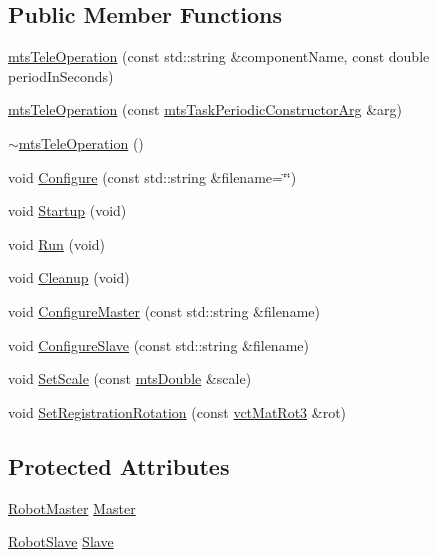 \subsection*{Public Member Functions}
\begin{DoxyCompactItemize}
\item 
\hyperlink{classmts_tele_operation_a6547280de1e8cdcade16708da2cccc2a}{mts\+Tele\+Operation} (const std\+::string \&component\+Name, const double period\+In\+Seconds)
\item 
\hyperlink{classmts_tele_operation_a4082b5b6eb45a3e05f9bce47e3de99d9}{mts\+Tele\+Operation} (const \hyperlink{classmts_task_periodic_constructor_arg}{mts\+Task\+Periodic\+Constructor\+Arg} \&arg)
\item 
\hyperlink{classmts_tele_operation_aa433b36bc093a7a386fb8c39682b6f19}{$\sim$mts\+Tele\+Operation} ()
\item 
void \hyperlink{classmts_tele_operation_a629c7e4761dc10f23f296b8110fa786f}{Configure} (const std\+::string \&filename=\char`\"{}\char`\"{})
\item 
void \hyperlink{classmts_tele_operation_a1561a15caad99bdcb5560eab8e831da7}{Startup} (void)
\item 
void \hyperlink{classmts_tele_operation_a9d7840b7ac88227c2b49cc83d98bdbb7}{Run} (void)
\item 
void \hyperlink{classmts_tele_operation_aa52d274db632fd939870d8cb0baaa7bf}{Cleanup} (void)
\item 
void \hyperlink{classmts_tele_operation_a32c09a7d07c963c2886abb789e3f875b}{Configure\+Master} (const std\+::string \&filename)
\item 
void \hyperlink{classmts_tele_operation_a918b83728d22310cbe11cbb4489475ec}{Configure\+Slave} (const std\+::string \&filename)
\item 
void \hyperlink{classmts_tele_operation_ae792bc5aa8b6787ba0ea60cad02dbca0}{Set\+Scale} (const \hyperlink{mts_generic_object_proxy_8h_a31e76b0190a8d3f9838626cd7b47bd75}{mts\+Double} \&scale)
\item 
void \hyperlink{classmts_tele_operation_a96fba782881d350e064a2b1f1d982882}{Set\+Registration\+Rotation} (const \hyperlink{vct_transformation_types_8h_a30fe23c1d38748a9b8f2fb9bb2471382}{vct\+Mat\+Rot3} \&rot)
\end{DoxyCompactItemize}
\subsection*{Protected Attributes}
\begin{DoxyCompactItemize}
\item 
\hyperlink{classmts_tele_operation_1_1_robot_master}{Robot\+Master} \hyperlink{classmts_tele_operation_ab6560f81ba718ab14e33e7e38cc33860}{Master}
\item 
\hyperlink{classmts_tele_operation_1_1_robot_slave}{Robot\+Slave} \hyperlink{classmts_tele_operation_a7199e0f2fd813b121f3a5a84aa61ee7b}{Slave}
\end{DoxyCompactItemize}
